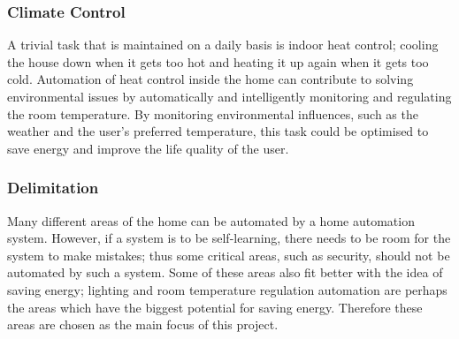 \subsubsection{Climate Control}
\label{sub:Clitemate Control}
A trivial task that is maintained on a daily basis is indoor heat control; cooling the house down when it gets too hot and heating it up again when it gets too cold. Automation of heat control inside the home can contribute to solving environmental issues by automatically and intelligently monitoring and regulating the room temperature. By monitoring environmental influences, such as the weather and the user's preferred temperature, this task could be optimised to save energy and improve the life quality of the user.

\subsubsection{Delimitation}
Many different areas of the home can be automated by a home automation system. However, if a system is to be self-learning, there needs to be room for the system to make mistakes; thus some critical areas, such as security, should not be automated by such a system. Some of these areas also fit better with the idea of saving energy; lighting and room temperature regulation automation are perhaps the areas which have the biggest potential for saving energy. Therefore these areas are chosen as the main focus of this project.
